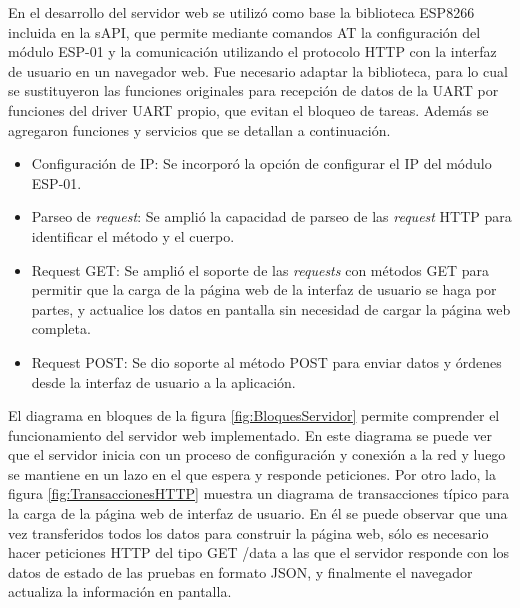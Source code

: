 En el desarrollo del servidor web se utilizó como base la biblioteca ESP8266 incluida en la sAPI, que permite mediante comandos AT la configuración del módulo ESP-01 y la comunicación utilizando el protocolo HTTP con la interfaz de usuario en un navegador web. Fue necesario adaptar la biblioteca, para lo cual se sustituyeron las  funciones originales para recepción de datos de la UART por funciones del driver UART propio, que evitan el bloqueo de tareas.
Además se agregaron funciones y servicios que se detallan a continuación.
\begin{itemize}
	\item Configuración de IP: Se incorporó la opción de configurar el IP del módulo ESP-01.
	\item Parseo de \textit{request}: Se amplió la capacidad de parseo de las \textit{request} HTTP para identificar el método y el cuerpo.
	\item Request GET: Se amplió el soporte de las \textit{requests} con métodos GET para permitir que la carga de la página web de la interfaz de usuario se haga por partes, y actualice los datos en pantalla sin necesidad de cargar la página web completa.
	\item Request POST: Se dio soporte al método POST para enviar datos y órdenes desde la interfaz de usuario a la aplicación.
\end{itemize}

El diagrama en bloques de la figura \ref{fig:BloquesServidor} permite comprender el funcionamiento del servidor web implementado. En este diagrama se puede ver que el servidor inicia con un proceso de configuración y conexión a la red y luego se mantiene en un lazo en el que espera y responde peticiones.
Por otro lado, la figura \ref{fig:TransaccionesHTTP} muestra un diagrama de transacciones típico para la carga de la página web de interfaz de usuario. En él se puede observar que una vez transferidos todos los datos para construir la página web, sólo es necesario hacer peticiones HTTP del tipo GET /data a las que el servidor responde con los datos de estado de las pruebas en formato JSON, y finalmente el navegador actualiza la información en pantalla.

